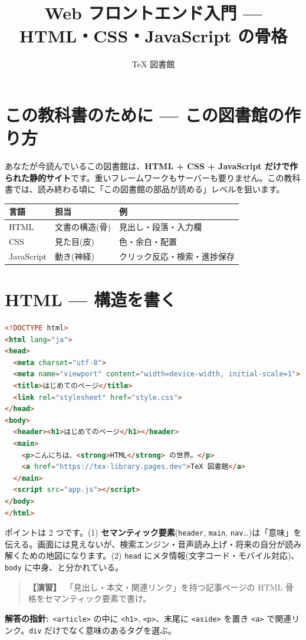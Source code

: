 \documentclass{article}
\title{Web フロントエンド入門 — HTML・CSS・JavaScript の骨格}
\author{TeX 図書館}
\begin{document}
\section{この教科書のために — この図書館の作り方}

あなたが今読んでいるこの図書館は、\textbf{HTML + CSS + JavaScript だけで作られた静的サイト}です。重いフレームワークもサーバーも要りません。この教科書では、読み終わる頃に「この図書館の部品が読める」レベルを狙います。

\begin{center}
\begin{tabular}{|l|l|l|}
\hline
言語 & 担当 & 例 \\
\hline
HTML & 文書の構造(骨) & 見出し・段落・入力欄 \\
CSS & 見た目(皮) & 色・余白・配置 \\
JavaScript & 動き(神経) & クリック反応・検索・進捗保存 \\
\hline
\end{tabular}
\end{center}

\section{HTML — 構造を書く}

\begin{lstlisting}[language=HTML]
<!DOCTYPE html>
<html lang="ja">
<head>
  <meta charset="utf-8">
  <meta name="viewport" content="width=device-width, initial-scale=1">
  <title>はじめてのページ</title>
  <link rel="stylesheet" href="style.css">
</head>
<body>
  <header><h1>はじめてのページ</h1></header>
  <main>
    <p>こんにちは、<strong>HTML</strong> の世界。</p>
    <a href="https://tex-library.pages.dev">TeX 図書館</a>
  </main>
  <script src="app.js"></script>
</body>
</html>
\end{lstlisting}

ポイントは 2 つです。(1) \textbf{セマンティック要素}(\texttt{header}, \texttt{main}, \texttt{nav}…)は「意味」を伝える。画面には見えないが、検索エンジン・音声読み上げ・将来の自分が読み解くための地図になります。(2) \texttt{head} にメタ情報(文字コード・モバイル対応)、\texttt{body} に中身、と分かれている。

\begin{quote}
\textbf{【演習】}\ 「見出し・本文・関連リンク」を持つ記事ページの HTML 骨格をセマンティック要素で書け。
\end{quote}

\textbf{解答の指針:}\ \texttt{<article>} の中に \texttt{<h1>}, \texttt{<p>}、末尾に \texttt{<aside>} を置き \texttt{<a>} で関連リンク。\texttt{div} だけでなく意味のあるタグを選ぶ。
\end{document}
